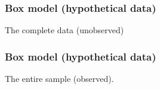 \documentclass[handout]{beamer}
\begin{document}
   \begin{frame}
   \frametitle{Box model (hypothetical data)}
   \begin{center}
   \end{center}
   The complete data (unobserved)
   \end{frame}



   \begin{frame}
   \frametitle{Box model (hypothetical data)}
   \begin{center}
   \end{center}
   The entire sample (observed).
   \end{frame}
\end{document}
